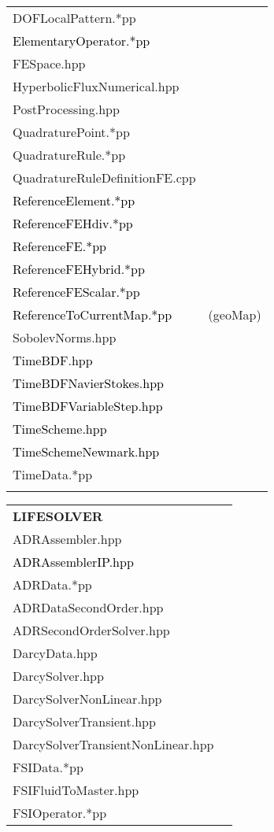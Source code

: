 \documentclass[10p]{article}
\newcommand{\newparts}[1]{\textcolor{black}{#1}}
\newcommand{\newpartsVC}[1]{\textcolor{black}{#1}}
\theoremstyle{definition}
\begin{document}
\begin{landscape}
\begin{table}[!h]
\begin{multicols}{4}
\begin{xtabular}{
p{0.18\textwidth}<{}
p{0.1\textwidth}<{}
}
DOFLocalPattern.*pp & \\
\newparts{ElementaryOperator.*pp} & \\
FESpace.hpp & \\
HyperbolicFluxNumerical.hpp & \\
PostProcessing.hpp & \\
QuadraturePoint.*pp & \\
QuadratureRule.*pp & \\
QuadratureRuleDefinitionFE.cpp & \\
\newpartsVC{ReferenceElement.*pp} & \\
\newpartsVC{ReferenceFEHdiv.*pp} & \\
\newpartsVC{ReferenceFE.*pp} & \\
\newpartsVC{ReferenceFEHybrid.*pp} & \\
\newpartsVC{ReferenceFEScalar.*pp} & \\
\newpartsVC{ReferenceToCurrentMap.*pp} & (geoMap)\\
SobolevNorms.hpp & \\
\newpartsVC{TimeBDF.hpp} & \\
\newpartsVC{TimeBDFNavierStokes.hpp} & \\
\newpartsVC{TimeBDFVariableStep.hpp} & \\
\newpartsVC{TimeScheme.hpp} & \\
\newpartsVC{TimeSchemeNewmark.hpp} & \\
TimeData.*pp & \\
& \\
\end{xtabular}
\begin{xtabular}{
p{0.28\textwidth}<{}
p{0.1\textwidth}<{}
}
\textbf{LIFESOLVER} \\
ADRAssembler.hpp & \\
\newparts{ADRAssemblerIP.hpp} & \\
ADRData.*pp & \\
ADRDataSecondOrder.hpp & \\
ADRSecondOrderSolver.hpp & \\
DarcyData.hpp & \\
DarcySolver.hpp & \\
DarcySolverNonLinear.hpp & \\
DarcySolverTransient.hpp & \\
DarcySolverTransientNonLinear.hpp & \\
FSIData.*pp & \\
FSIFluidToMaster.hpp & \\
FSIOperator.*pp & \\

\end{xtabular}
\end{multicols}
\end{table}
\end{landscape}
\end{document}
